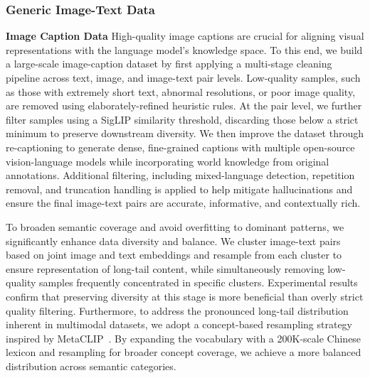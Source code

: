 \documentclass{article}
\begin{document}
\subsubsection{Generic Image-Text Data} \label{sec:pretrain_generic_image_text_data}
\textbf{Image Caption Data}
High-quality image captions are crucial for aligning visual representations with the language model’s knowledge space. To this end, we build a large-scale image-caption dataset by first applying a multi-stage cleaning pipeline across text, image, and image-text pair levels. Low-quality samples, such as those with extremely short text, abnormal resolutions, or poor image quality, are removed using elaborately-refined heuristic rules. At the pair level, we further filter samples using a SigLIP similarity threshold, discarding those below a strict minimum to preserve downstream diversity. We then improve the dataset through re-captioning to generate dense, fine-grained captions with multiple open-source vision-language models while incorporating world knowledge from original annotations. Additional filtering, including mixed-language detection, repetition removal, and truncation handling is applied to help mitigate hallucinations and ensure the final image-text pairs are accurate, informative, and contextually rich.

To broaden semantic coverage and avoid overfitting to dominant patterns, we significantly enhance data diversity and balance. We cluster image-text pairs based on joint image and text embeddings and resample from each cluster to ensure representation of long-tail content, while simultaneously removing low-quality samples frequently concentrated in specific clusters. Experimental results confirm that preserving diversity at this stage is more beneficial than overly strict quality filtering. Furthermore, to address the pronounced long-tail distribution inherent in multimodal datasets, we adopt a concept-based resampling strategy inspired by MetaCLIP~\citep{xu2023demystifying}. By expanding the vocabulary with a 200K-scale Chinese lexicon and resampling for broader concept coverage, we achieve a more balanced distribution across semantic categories. 
\end{document}
